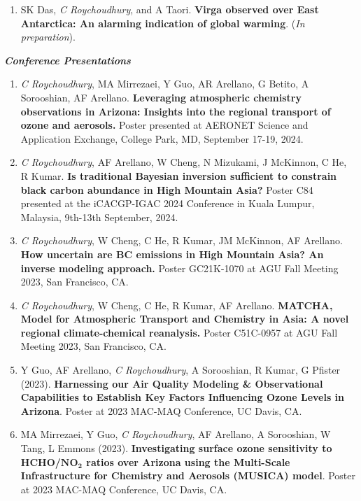 \documentclass[margin,line]{resume}
\begin{document}
\begin{resume}
\begin{enumerate}[topsep=1pt, partopsep=1pt, itemsep=0.5pt, parsep=0.1pt, leftmargin=15pt,label=\arabic*.]
			\item SK Das, \textit{C Roychoudhury}, and A Taori.
			\textbf{Virga observed over East Antarctica: An alarming indication of global warming}. (\emph{In preparation}).
			
			
		\end{enumerate}
		
	
	\textbf{\emph{\textcolor{sep}{Conference Presentations}}}
		\begin{enumerate}[topsep=1pt, partopsep=1pt, itemsep=0.5pt, parsep=0.1pt, leftmargin=15pt,label=\arabic*.]
			
			\item \textit{C Roychoudhury}, MA Mirrezaei, Y Guo, AR Arellano, G Betito, A Sorooshian, AF Arellano.  \textbf{Leveraging atmospheric chemistry observations in Arizona: Insights into the regional transport of ozone and aerosols.} Poster presented at AERONET Science and Application Exchange, College Park, MD, September 17-19, 2024.
			
			\item \textit{C Roychoudhury}, AF Arellano, W Cheng, N Mizukami, J McKinnon, C He, R Kumar. \textbf{Is traditional Bayesian inversion sufficient to constrain black carbon abundance in High Mountain Asia?} Poster C84 presented at the iCACGP-IGAC 2024 Conference in Kuala Lumpur, Malaysia, 9th-13th September, 2024.
			
			\item \textit{C Roychoudhury}, W Cheng, C He, R Kumar, JM McKinnon, AF Arellano. \textbf{How uncertain are BC emissions in High Mountain Asia? An inverse modeling approach.} Poster GC21K-1070 at AGU Fall Meeting 2023, San Francisco, CA. 
			
			\item \textit{C Roychoudhury}, W Cheng, C He, R Kumar, AF Arellano. \textbf{MATCHA, Model for Atmospheric Transport and Chemistry in Asia: A novel regional climate-chemical reanalysis.} Poster C51C-0957 at AGU Fall Meeting 2023, San Francisco, CA.
			
			\item Y Guo, AF Arellano, \textit{C Roychoudhury}, A Sorooshian, R Kumar, G Pfister (2023). \textbf{Harnessing our Air Quality Modeling \& Observational Capabilities to Establish Key Factors Influencing Ozone Levels in Arizona}. Poster at 2023 MAC-MAQ Conference, UC Davis, CA.
			
			\item MA Mirrezaei, Y Guo, \textit{C Roychoudhury}, AF Arellano, A Sorooshian, W Tang, L Emmons (2023). \textbf{Investigating surface ozone sensitivity to HCHO/$\mathbf{NO_2}$ ratios over Arizona using the Multi-Scale Infrastructure for Chemistry and Aerosols (MUSICA) model}. Poster at 2023 MAC-MAQ Conference, UC Davis, CA.
			

\end{enumerate}
\end{resume}
\end{document}
